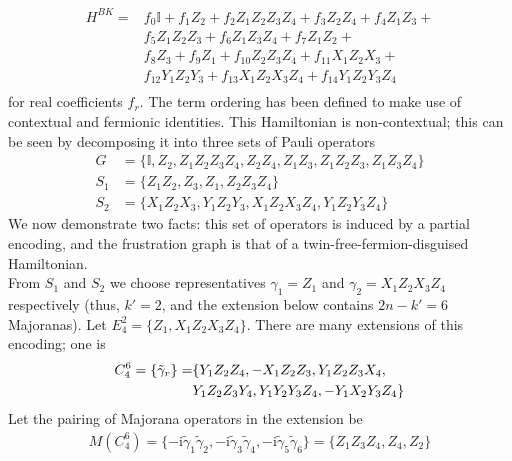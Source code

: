 \documentclass[%
 aip,
 amsmath,amssymb,
 reprint,%
]{revtex4-1}
\newcommand{\Id}{\mathbb{I}}       %
\begin{document}
\begin{equation*}
\begin{aligned}
H^{BK} =& f_0\Id + f_1 Z_2 + f_2 Z_1 Z_2 Z_3 Z_4 + f_3Z_2Z_4 +  f_4Z_1Z_3 + \\
 &f_5Z_1Z_2Z_3 + f_6 Z_1Z_3Z_4 + f_7 Z_1Z_2 + \\
     & f_8 Z_3 + f_9 Z_1 + f_{10}Z_2Z_3Z_4 + f_{11} X_1 Z_2 X_3 + \\
     &f_{12} Y_1 Z_2 Y_3 + f_{13} X_1 Z_2 X_3 Z_4 + f_{14} Y_1 Z_2 Y_3 Z_4\\
\end{aligned}
\label{eq:h2-bravyi-kitaev-hamiltonian}
\end{equation*}
for real coefficients $f_r$. The term ordering has been defined to make use of contextual and fermionic identities. This Hamiltonian is non-contextual; this can be seen by decomposing it into three sets of Pauli operators 
\begin{align*}
    G &= \{\Id, Z_2, Z_1 Z_2 Z_3 Z_4,Z_2Z_4,Z_1Z_3,Z_1Z_2Z_3, Z_1Z_3Z_4 \}
    \\
    S_1 &= \{Z_1Z_2, Z_3, Z_1, Z_2Z_3Z_4  \}
    \\
    S_2 &= \{X_1 Z_2 X_3 , Y_1 Z_2 Y_3, X_1 Z_2 X_3 Z_4, Y_1 Z_2 Y_3 Z_4\}
\end{align*}
We now demonstrate two facts: this set of operators is induced by a partial encoding, and the frustration graph is that of a twin-free-fermion-disguised Hamiltonian. \\ 
\indent From $S_1$ and $S_2$ we choose representatives $\gamma_1 = Z_1$ and $\gamma_2 = X_1 Z_2 X_3 Z_4$ respectively (thus, $k'=2$, and the extension below contains $2n-k'=6$ Majoranas). Let $E_4^2 = \{Z_1, X_1 Z_2 X_3 Z_4 \}$. There are many extensions of this encoding; one is 
\begin{align*}
    C_4^{6} = \{\tilde{\gamma}_r \} = &\{{Y_1Z_2Z_4, -X_1Z_2Z_3, Y_1Z_2Z_3X_4,} \notag\\
    & {Y_1Z_2Z_3Y_4, Y_1Y_2Y_3Z_4, -Y_1X_2Y_3Z_4}\}
\end{align*}
Let the pairing of Majorana operators in the extension be 
\begin{align*}
    M(C_4^{6}) = \{{-\mathrm{i}}\tilde{\gamma}_1 \tilde{\gamma}_2, {-\mathrm{i}}\tilde{\gamma}_3 \tilde{\gamma}_4, {-\mathrm{i}}\tilde{\gamma}_5 \tilde{\gamma}_6 \} = \{Z_1Z_3Z_4, Z_4, Z_2 \}
\end{align*}
\end{document}

